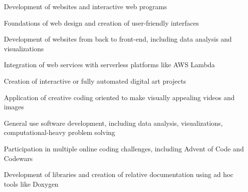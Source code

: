 \documentclass[]{plushcv}
\begin{document}
\begin{minipage}[t]{0.60\textwidth}

  \begin{tightemize}
    \item Development of websites and interactive web programs
    \item Foundations of web design and creation of user-friendly interfaces
  \end{tightemize}
  \sectionsep

  \begin{tightemize}
    \item Development of websites from back to front-end, including data analysis and visualizations
    \item Integration of web services with serverless platforms like AWS Lambda
  \end{tightemize}
  \sectionsep

  \begin{tightemize}
    \item Creation of interactive or fully automated digital art projects
    \item Application of creative coding oriented to make visually appealing videos and images
  \end{tightemize}
  \sectionsep

  \begin{tightemize}
    \item General use software development, including data analysis, visualizations, computational-heavy problem solving
    \item Participation in multiple online coding challenges, including Advent of Code and Codewars
    \item Development of libraries and creation of relative documentation using ad hoc tools like Doxygen
  \end{tightemize}
  \sectionsep


\end{minipage}
\hfill
\end{document}
